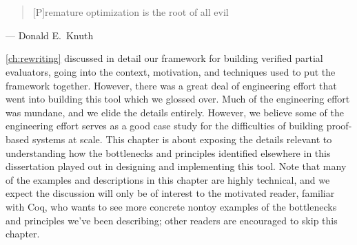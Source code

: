 \chapter{}\label{ch:rewriting-more}
%

\begin{quote}
  [P]remature optimization is the root of all evil
\end{quote}
\begin{flushright}
  --- Donald E.~Knuth~\cite[p.~671]{KnuthPrematureOptimization}
\end{flushright}

\vspace{2\baselineskip}

\autoref{ch:rewriting} discussed in detail our framework for building verified partial evaluators, going into the context, motivation, and techniques used to put the framework together.
However, there was a great deal of engineering effort that went into building this tool which we glossed over.
Much of the engineering effort was mundane, and we elide the details entirely.
However, we believe some of the engineering effort serves as a good case study for the difficulties of building proof-based systems at scale.
This chapter is about exposing the details relevant to understanding how the bottlenecks and principles identified elsewhere in this dissertation played out in designing and implementing this tool.
Note that many of the examples and descriptions in this chapter are highly technical, and we expect the discussion will only be of interest to the motivated reader, familiar with Coq, who wants to see more concrete nontoy examples of the bottlenecks and principles we've been describing; other readers are encouraged to skip this chapter.


